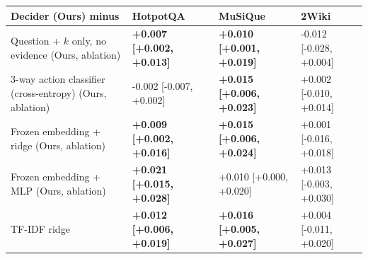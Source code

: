 \begin{tabular}{@{}llll@{}}
\toprule
Decider (Ours) minus & HotpotQA & MuSiQue & 2Wiki\\
\midrule
Question + $k$ only, no evidence (Ours, ablation) & \textbf{+0.007 [+0.002, +0.013]} & \textbf{+0.010 [+0.001, +0.019]} & -0.012 [-0.028, +0.004]\\
3-way action classifier (cross-entropy) (Ours, ablation) & -0.002 [-0.007, +0.002] & \textbf{+0.015 [+0.006, +0.023]} & +0.002 [-0.010, +0.014]\\
Frozen embedding + ridge (Ours, ablation) & \textbf{+0.009 [+0.002, +0.016]} & \textbf{+0.015 [+0.006, +0.024]} & +0.001 [-0.016, +0.018]\\
Frozen embedding + MLP (Ours, ablation) & \textbf{+0.021 [+0.015, +0.028]} & +0.010 [+0.000, +0.020] & +0.013 [-0.003, +0.030]\\
TF-IDF ridge & \textbf{+0.012 [+0.006, +0.019]} & \textbf{+0.016 [+0.005, +0.027]} & +0.004 [-0.011, +0.020]\\
\bottomrule
\end{tabular}
